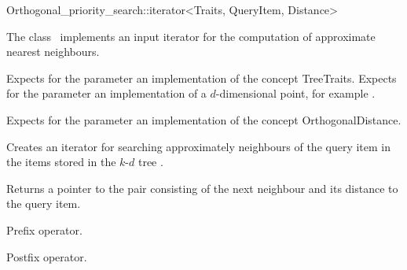 \begin{ccRefClass}{Orthogonal_priority_search::iterator<Traits, QueryItem, Distance>}  %


\ccDefinition

The class \ccRefName\ implements an input iterator
for the computation of approximate nearest neighbours.


\ccParameters

Expects for the parameter  an implementation of the concept TreeTraits.
Expects for the parameter   an implementation of a $d$-dimensional point, 
for example .

Expects for the parameter  an implementation of the concept OrthogonalDistance. 

\ccCreation
{}  %

{Creates an iterator for searching approximately neighbours of the query item 
in the items stored in the $k$-$d$ tree .}


{Returns a pointer to the pair consisting of the next neighbour and its distance
to the query item.}

{Prefix operator.}

{Postfix operator.}


\end{ccRefClass}
